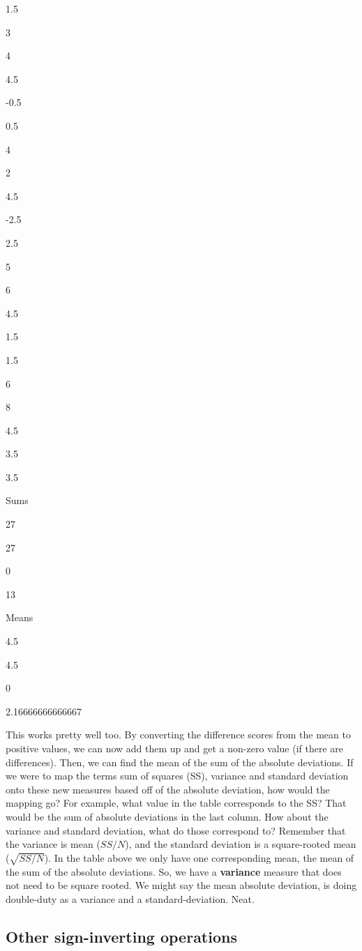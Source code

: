 \documentclass[
]{book}
\begin{document}
1.5

3

4

4.5

-0.5

0.5

4

2

4.5

-2.5

2.5

5

6

4.5

1.5

1.5

6

8

4.5

3.5

3.5

Sums

27

27

0

13

Means

4.5

4.5

0

2.16666666666667

This works pretty well too. By converting the difference scores from the mean to positive values, we can now add them up and get a non-zero value (if there are differences). Then, we can find the mean of the sum of the absolute deviations. If we were to map the terms sum of squares (SS), variance and standard deviation onto these new measures based off of the absolute deviation, how would the mapping go? For example, what value in the table corresponds to the SS? That would be the sum of absolute deviations in the last column. How about the variance and standard deviation, what do those correspond to? Remember that the variance is mean (\(SS/N\)), and the standard deviation is a square-rooted mean (\(\sqrt{SS/N}\)). In the table above we only have one corresponding mean, the mean of the sum of the absolute deviations. So, we have a \textbf{variance} measure that does not need to be square rooted. We might say the mean absolute deviation, is doing double-duty as a variance and a standard-deviation. Neat.

\hypertarget{other-sign-inverting-operations}{%
\subsection{Other sign-inverting operations}\label{other-sign-inverting-operations}}
\end{document}
